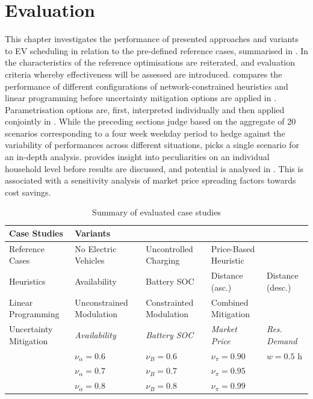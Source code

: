 \chapter{Evaluation}
\label{sec:eval}

This chapter investigates the performance of presented approaches and variants to EV scheduling in relation to the pre-defined reference cases, summarised in . In  the characteristics of the reference optimisations are reiterated, and evaluation criteria whereby effectiveness will be assessed are introduced.  compares the performance of different configurations of network-constrained heuristics and linear programming before uncertainty mitigation options are applied in . Parametrisation options are, first, interpreted individually and then applied conjointly in . While the preceding sections judge based on the aggregate of 20 scenarios corresponding to a four week weekday period to hedge against the variability of performances across different situations,  picks a single scenario for an in-depth analysis.  provides insight into peculiarities on an individual household level before results are discussed, and potential is analysed in . This is associated with a sensitivity analysis of market price spreading factors towards cost savings.

\begin{table}[]
	\centering
	\scriptsize
	\begin{tabular}{@{}lllll@{}}
		\toprule
		\textbf{Case Studies}  & \textbf{Variants}        &                         &                       &                             \\ \midrule
		Reference Cases        & No Electric Vehicles     & Uncontrolled Charging   & Price-Based Heuristic &                             \\ \midrule
		Heuristics             & Availability             & Battery SOC             & Distance (asc.)       & Distance (desc.)            \\ \midrule
		Linear Programming     & Unconstrained Modulation & Constrainted Modulation & Combined Mitigation   &                             \\ \midrule
		Uncertainty Mitigation & \textit{Availability}    & \textit{Battery SOC}    & \textit{Market Price} & \textit{Res. Demand} \\  \cmidrule{2-5}
		& $\nu_\alpha = 0.6$       & $\nu_B = 0.6$           & $\nu_\pi = 0.90$      & $w = 0.5 $ h                 \\
		& $\nu_\alpha = 0.7$       & $\nu_B = 0.7$           & $\nu_\pi = 0.95$      &                             \\
		& $\nu_\alpha = 0.8$       & $\nu_B = 0.8$           & $\nu_\pi = 0.99$      &                             \\ \bottomrule
	\end{tabular}
	\caption{Summary of evaluated case studies}
	\label{tab:casestuds}
\end{table}

